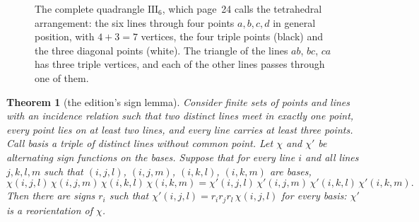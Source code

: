\documentclass[11pt,a4paper]{amsart}
\newtheorem{theorem}{Theorem}[section]
\theoremstyle{definition}
\theoremstyle{remark}
\newcommand{\III}{\mathrm{III}_{6}}
\begin{document}
\begin{figure}[ht]
\centering
{}
\caption{The complete quadrangle $\III$, which page~24 calls the tetrahedral arrangement: the six lines through four points $a, b, c, d$ in general position, with $4 + 3 = 7$ vertices, the four triple points (black) and the three diagonal points (white). The triangle of the lines $ab$, $bc$, $ca$ has three triple vertices, and each of the other lines passes through one of them.}\label{fig:III}
\end{figure}

\begin{theorem}[the edition's sign lemma]\label{thm:chirotope}
Consider finite sets of points and lines with an incidence relation such that two distinct lines meet in exactly one point, every point lies on at least two lines, and every line carries at least three points. Call \emph{basis} a triple of distinct lines without common point. Let $\chi$ and $\chi'$ be alternating sign functions on the bases. Suppose that for every line $i$ and all lines $j, k, l, m$ such that $(i, j, l)$, $(i, j, m)$, $(i, k, l)$, $(i, k, m)$ are bases,
\[
\chi(i,j,l)\,\chi(i,j,m)\,\chi(i,k,l)\,\chi(i,k,m) = \chi'(i,j,l)\,\chi'(i,j,m)\,\chi'(i,k,l)\,\chi'(i,k,m).
\]
Then there are signs $r_i$ such that $\chi'(i,j,l) = r_i r_j r_l\,\chi(i,j,l)$ for every basis: $\chi'$ is a reorientation of $\chi$.
\end{theorem}
\end{document}
